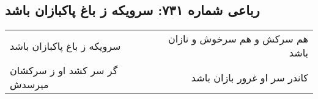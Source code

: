 \begin{center}
\section*{رباعی شماره ۷۳۱: سرویکه ز باغ پاکبازان باشد}
\label{sec:0731}
\begin{longtable}{l p{0.5cm} r}
سرویکه ز باغ پاکبازان باشد
&&
هم سرکش و هم سرخوش و نازان باشد
\\
گر سر کشد او ز سرکشان میرسدش
&&
کاندر سر او غرور بازان باشد
\\
\end{longtable}
\end{center}
